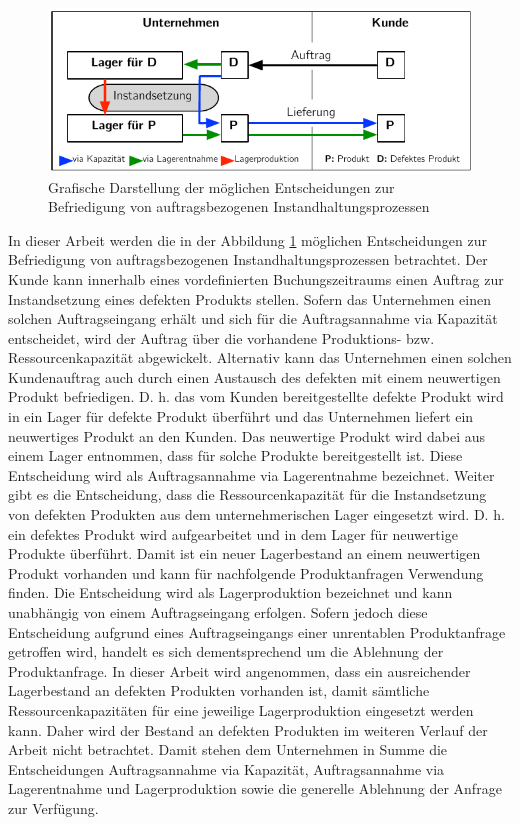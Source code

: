 \begin{figure}[h!]
  \begin{center}
    \includegraphics[width=120mm]{Bilder/Konzept.pdf}
    \caption{Grafische Darstellung der möglichen Entscheidungen zur Befriedigung von auftragsbezogenen Instandhaltungsprozessen}  \label{Konzept}
  \end{center}
\end{figure}

In dieser Arbeit werden die in der Abbildung \ref{Konzept} möglichen Entscheidungen zur Befriedigung von auftragsbezogenen Instandhaltungsprozessen betrachtet. Der Kunde kann innerhalb eines vordefinierten Buchungszeitraums einen Auftrag zur Instandsetzung eines defekten Produkts stellen. Sofern das Unternehmen einen solchen Auftragseingang erhält und sich für die \glqq Auftragsannahme via Kapazität{\grqq} entscheidet, wird der Auftrag über die vorhandene Produktions- bzw. Ressourcenkapazität abgewickelt. Alternativ kann das Unternehmen einen solchen Kundenauftrag auch durch einen Austausch des defekten mit einem neuwertigen Produkt befriedigen. D. h. das vom Kunden bereitgestellte defekte Produkt wird in ein Lager für defekte Produkt überführt und das Unternehmen liefert ein neuwertiges Produkt an den Kunden. Das neuwertige Produkt wird dabei aus einem Lager entnommen, dass für solche Produkte bereitgestellt ist. Diese Entscheidung wird als \glqq Auftragsannahme via Lagerentnahme{\grqq} bezeichnet. Weiter gibt es die Entscheidung, dass die Ressourcenkapazität für die Instandsetzung von defekten Produkten aus dem unternehmerischen Lager eingesetzt wird. D. h. ein defektes Produkt wird aufgearbeitet und in dem Lager für neuwertige Produkte überführt. Damit ist ein neuer Lagerbestand an einem neuwertigen Produkt vorhanden und kann für nachfolgende Produktanfragen Verwendung finden. Die Entscheidung wird als \glqq Lagerproduktion{\grqq} bezeichnet und kann unabhängig von einem Auftragseingang erfolgen. Sofern jedoch diese Entscheidung aufgrund eines Auftragseingangs einer unrentablen Produktanfrage getroffen wird, handelt es sich dementsprechend um die Ablehnung der Produktanfrage. In dieser Arbeit wird angenommen, dass ein ausreichender Lagerbestand an defekten Produkten vorhanden ist, damit sämtliche Ressourcenkapazitäten für eine jeweilige Lagerproduktion eingesetzt werden kann. Daher wird der Bestand an defekten Produkten im weiteren Verlauf der Arbeit nicht betrachtet. Damit stehen dem Unternehmen in Summe die Entscheidungen \glqq Auftragsannahme via Kapazität{\grqq}, \glqq Auftragsannahme via Lagerentnahme{\grqq} und \glqq Lagerproduktion{\grqq} sowie die generelle \glqq Ablehnung der Anfrage{\grqq} zur Verfügung.

